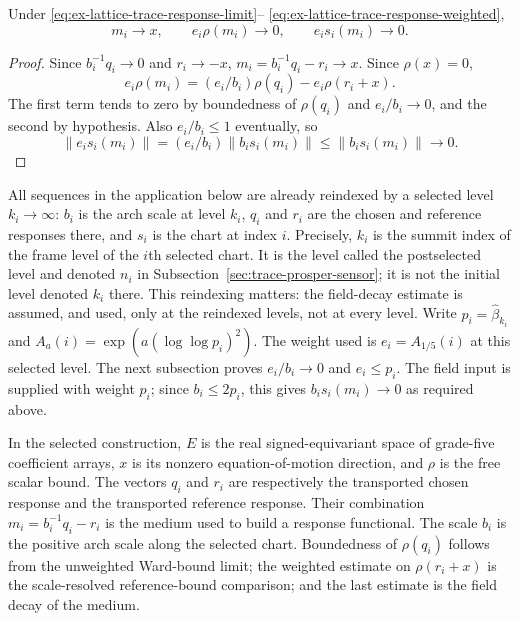 \begin{lemma}
\label{lem:ex-lattice-trace-medium-receipts}
Under \eqref{eq:ex-lattice-trace-response-limit}--
\eqref{eq:ex-lattice-trace-response-weighted},
\[
 m_i\longrightarrow x,\qquad
 e_i\rho(m_i)\longrightarrow0,\qquad
 e_i s_i(m_i)\longrightarrow0.
\]
\end{lemma}
\begin{proof}
Since $b_i^{-1}q_i\to0$ and $r_i\to-x$,
$m_i=b_i^{-1}q_i-r_i\to x$. Since $\rho(x)=0$,
\[
 e_i\rho(m_i)=(e_i/b_i)\rho(q_i)-e_i\rho(r_i+x).
\]
The first term tends to zero by boundedness of $\rho(q_i)$ and
$e_i/b_i\to0$, and the second by hypothesis. Also $e_i/b_i\le1$
eventually, so
\[
 \|e_i s_i(m_i)\|=(e_i/b_i)\|b_i s_i(m_i)\|
 \le\|b_i s_i(m_i)\|\longrightarrow0.
\]
\end{proof}

All sequences in the application below are already reindexed by a
selected level $k_i\to\infty$: $b_i$ is the
arch scale at level $k_i$, $q_i$ and $r_i$ are the chosen and reference
responses there, and $s_i$ is the chart at index $i$. Precisely, $k_i$ is
the summit index of the frame level of the $i$th selected chart. It is the
level called the postselected level and denoted $n_i$ in
Subsection~\ref{sec:trace-prosper-sensor}; it is not the initial level
denoted $k_i$ there. This reindexing matters:
the field-decay estimate is assumed, and used, only at the reindexed
levels, not at every level. Write $p_i=\widehat\beta_{k_i}$ and
$A_a(i)=\exp(a(\log\log p_i)^2)$. The weight used is
$e_i=A_{1/5}(i)$ at this selected level. The next subsection proves
$e_i/b_i\to0$ and
$e_i\le p_i$. The field input is supplied with weight $p_i$; since
$b_i\le2p_i$, this gives $b_i s_i(m_i)\to0$ as required above.

In the selected construction, $E$ is the real signed-equivariant space of
grade-five coefficient arrays, $x$ is its nonzero equation-of-motion
direction, and $\rho$ is the free scalar bound. The vectors $q_i$ and
$r_i$ are respectively the transported chosen response and the transported
reference response. Their combination $m_i=b_i^{-1}q_i-r_i$ is the
medium used to build a response functional. The scale $b_i$ is the positive
arch scale along the selected chart. Boundedness of $\rho(q_i)$ follows from the unweighted Ward-bound limit;
the weighted estimate on $\rho(r_i+x)$ is the scale-resolved
reference-bound comparison; and the last estimate is the field decay of
the medium.

